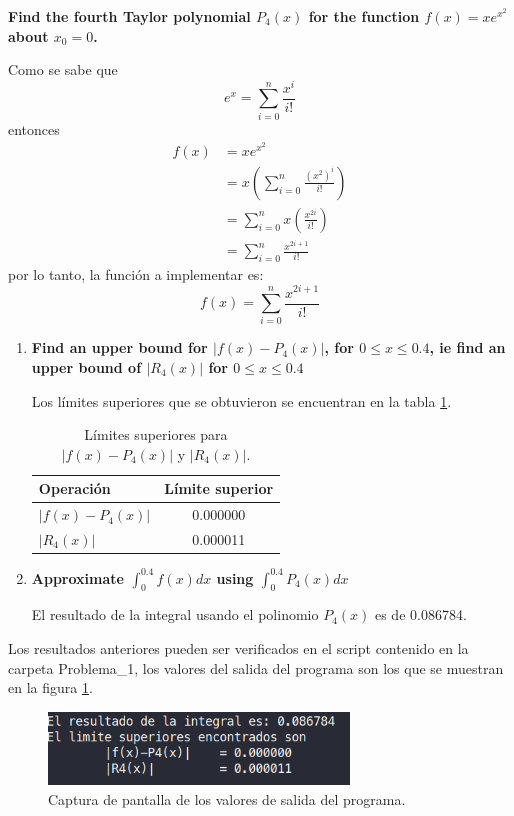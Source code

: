 \item \textbf{Find the fourth Taylor polynomial $P_4(x)$ for the function $f (x) = xe^{x^2}$ about $x_0 = 0$.}

Como se sabe que
\begin{equation*}
    e^x= \sum_{i=0}^n \frac{x^i}{i!}
\end{equation*}
entonces
\begin{align*}
    f(x) & =xe^{x^2}                                       \\
         & =x \left(\sum_{i=0}^n \frac{(x^2)^i}{i!}\right) \\
         & =  \sum_{i=0}^n x\left(\frac{x^{2i}}{i!}\right) \\
         & = \sum_{i=0}^n \frac{x^{2i+1}}{i!}
\end{align*}
por lo tanto, la función a implementar es:
\begin{equation*}
    f(x)= \sum_{i=0}^n \frac{x^{2i+1}}{i!}
\end{equation*}
\begin{enumerate}
    \item \textbf{Find an upper bound for $|f (x)-P_4 (x)|$, for $0 \leq x \leq 0.4$, ie find an upper bound of $|R_4 (x)|$ for $0 \leq x \leq 0.4$}

          Los límites superiores que se obtuvieron se encuentran en la tabla \ref{table:problema1}.
          \begin{table}[H]
              \centering
              \begin{tabular}{lc} \hline
                  \textbf{Operación} & \textbf{Límite superior} \\ \hline
                  $|f(x)-P_4(x)|$    & 0.000000                 \\
                  $|R_4(x)|$         & 0.000011                 \\ \hline
              \end{tabular}
              \caption{Límites superiores para $|f(x)-P_4(x)|$ y $|R_4(x)|$.}
              \label{table:problema1}
          \end{table}
    \item \textbf{Approximate $\int_0^{0.4} f(x)dx$ using $\int_0^{0.4} P_4(x)dx$}

          El resultado de la integral usando el polinomio $P_4(x)$ es de 0.086784.
\end{enumerate}
Los resultados anteriores pueden ser verificados en el script contenido en la carpeta \textcolor{citecolor}{Problema\_1}, los valores del salida del programa son los que se muestran en la figura \ref{fig:problema1ss}.
\begin{figure}[H]
    \centering
    \includegraphics[width=8cm]{Graphics/problema1_ss.png}
    \caption{Captura de pantalla de los valores de salida del programa.}
    \label{fig:problema1ss}
\end{figure}